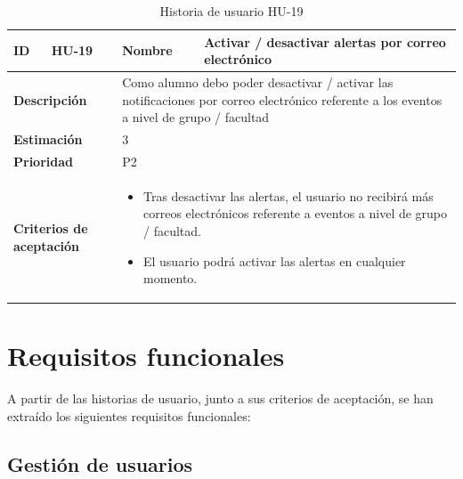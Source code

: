 \begin{table}[H]
    \centering
    \begin{tabular}{|p{2cm}|p{4cm}|p{2cm}|p{4cm}|}
        \hline
        \textbf{ID} & HU-19 & \textbf{Nombre} & Activar / desactivar alertas por correo electrónico \\
        \hline
        \multicolumn{2}{|p{6cm}|}{\textbf{Descripción}} & \multicolumn{2}{p{6cm}|}{Como alumno debo poder desactivar / activar las notificaciones por correo electrónico referente a los eventos a nivel de grupo / facultad} \\
        \hline
        \multicolumn{2}{|p{6cm}|}{\textbf{Estimación}} & \multicolumn{2}{p{6cm}|}{3} \\
        \hline
        \multicolumn{2}{|p{6cm}|}{\textbf{Prioridad}} & \multicolumn{2}{p{6cm}|}{P2} \\
        \hline
        \multicolumn{2}{|p{6cm}|}{\textbf{Criterios de aceptación}} & \multicolumn{2}{p{6cm}|}{
            \begin{itemize}
                \item Tras desactivar las alertas, el usuario no recibirá más correos electrónicos referente a eventos a nivel de grupo / facultad.
                \item El usuario podrá activar las alertas en cualquier momento.
            \end{itemize}
        } \\
        \hline
    \end{tabular}
    \caption{Historia de usuario HU-19}
    \label{tab:hu_19}
\end{table}

\section{Requisitos funcionales}

A partir de las historias de usuario, junto a sus criterios de aceptación, se han extraído los siguientes requisitos funcionales:

\subsection{Gestión de usuarios}

